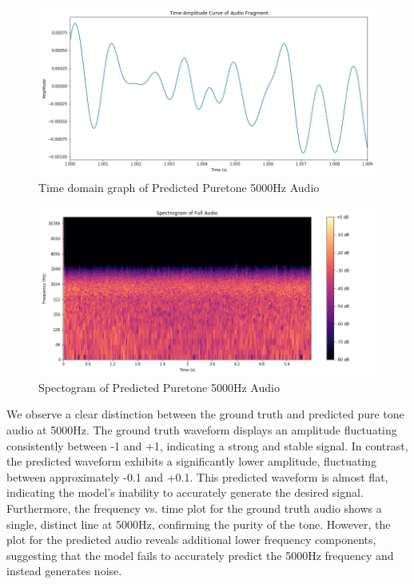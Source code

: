 \documentclass{ioereport}
\begin{document}
    \begin{figure}[H]
        \centering
        \includegraphics[width=\linewidth]{assets/audio_results/predpuretone5000hztime.png}
        \caption{Time domain graph of Predicted Puretone 5000Hz Audio}
        \label{fig:pred-pure5000-time}
    \end{figure}
    \begin{figure}[H]
        \centering
        \includegraphics[width=\linewidth]{assets/audio_results/predpuretone5000hzspec.png}
        \caption{Spectogram of Predicted Puretone 5000Hz Audio}
        \label{fig:pred-pure5000-spec}
    \end{figure}


    We observe a clear distinction between the ground truth and predicted pure tone audio at 5000Hz. The ground truth waveform displays an amplitude fluctuating consistently between -1 and +1, indicating a strong and stable signal. In contrast, the predicted waveform exhibits a significantly lower amplitude, fluctuating between approximately -0.1 and +0.1. This predicted waveform is almost flat, indicating the model's inability to accurately generate the desired signal. Furthermore, the frequency vs. time plot for the ground truth audio shows a single, distinct line at 5000Hz, confirming the purity of the tone. However, the plot for the predicted audio reveals additional lower frequency components, suggesting that the model fails to accurately predict the 5000Hz frequency and instead generates noise.
\end{document}
